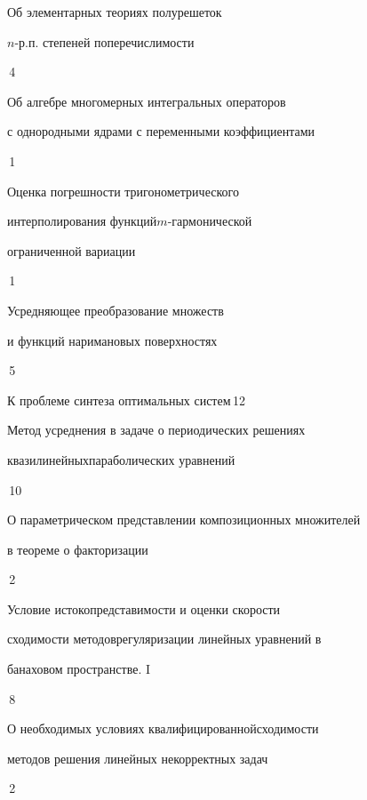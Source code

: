 

{Об элементарных теориях полурешеток


$n$-р.п. степеней по\newline перечислимости}{\No\,4}




{Об алгебре многомерных интегральных операторов\newline


с однородными ядрами с переменными коэффициентами}{\No\,1}




{Оценка погрешности тригонометрического


интерполирования функций\newline $m$-гармонической


ограниченной вариации}{\No\,1}




{Усредняющее преобразование множеств


и функций на\newline римановых поверхностях}{\No\,5}




{К проблеме синтеза оптимальных систем}{\No\,12}




{Метод усреднения в задаче о периодических решениях 


квазилинейных\newline параболических уравнений}{\No\,10}




{О параметрическом представлении композиционных множителей\newline


в теореме о факторизации}{\No\,2}




{Условие истокопредставимости и оценки скорости 


сходимости методов\newline регуляризации линейных уравнений в 


банаховом пространстве. I}{\No\,8}




{О необходимых условиях квалифицированной\newline сходимости 


методов решения линейных некорректных задач}{\No\,2}


